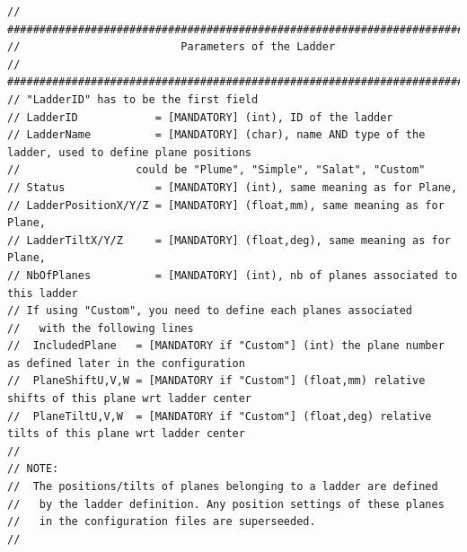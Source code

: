 \documentclass[a4paper, 12pt, twoside]{article}
\begin{document}
\begin{verbatim}
// #############################################################################
//                         Parameters of the Ladder
// #############################################################################
// "LadderID" has to be the first field
// LadderID            = [MANDATORY] (int), ID of the ladder
// LadderName          = [MANDATORY] (char), name AND type of the ladder, used to define plane positions
//                  could be "Plume", "Simple", "Salat", "Custom"
// Status              = [MANDATORY] (int), same meaning as for Plane,
// LadderPositionX/Y/Z = [MANDATORY] (float,mm), same meaning as for Plane,
// LadderTiltX/Y/Z     = [MANDATORY] (float,deg), same meaning as for Plane,
// NbOfPlanes          = [MANDATORY] (int), nb of planes associated to this ladder
// If using "Custom", you need to define each planes associated
//   with the following lines
//  IncludedPlane   = [MANDATORY if "Custom"] (int) the plane number as defined later in the configuration
//  PlaneShiftU,V,W = [MANDATORY if "Custom"] (float,mm) relative shifts of this plane wrt ladder center
//  PlaneTiltU,V,W  = [MANDATORY if "Custom"] (float,deg) relative tilts of this plane wrt ladder center
//
// NOTE:
//  The positions/tilts of planes belonging to a ladder are defined 
//   by the ladder definition. Any position settings of these planes 
//   in the configuration files are superseeded.
//



\end{verbatim}
\end{document}
